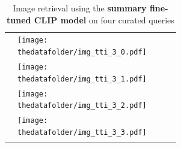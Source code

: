 \documentclass[10pt]{article} %
\newcommand{\SM}[1]{\textcolor{blue}{[SM: #1]}}
\begin{document}
\begin{table}[h!]
\begin{tabular}{m{3cm} p{3cm} p{3cm} p{3cm} p{3cm}}
      \midrule
      \texttt{} \vspace{20mm} & \centering \texttt{[image: \\thedatafolder/img\_tti\_3\_0.pdf]} \\  & \centering \texttt{[image: \\thedatafolder/img\_tti\_3\_1.pdf]} \\  & \centering \texttt{[image: \\thedatafolder/img\_tti\_3\_2.pdf]} \\  & \centering \texttt{[image: \\thedatafolder/img\_tti\_3\_3.pdf]} \\   \tabularnewline
      \bottomrule
  \end{tabular}
  \caption{Image retrieval using the \textbf{\textcolor{deepred}{summary fine-tuned CLIP model}} on four curated queries}
  \label{tab:tti}
\end{table}


\end{document}
